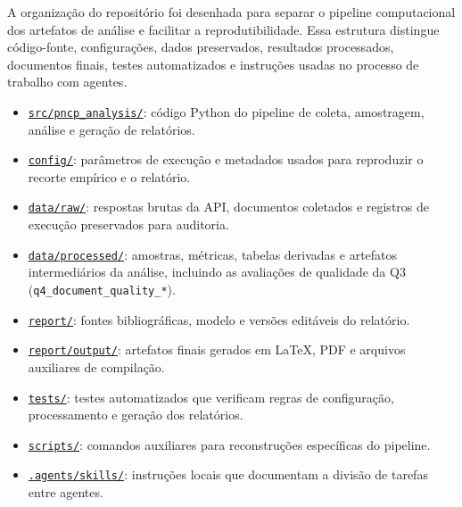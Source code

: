 \documentclass[12pt]{article}
\providecommand{\tightlist}{%
  \setlength{\itemsep}{0pt}\setlength{\parskip}{0pt}}
\begin{document}
A organização do repositório foi desenhada para separar o pipeline
computacional dos artefatos de análise e facilitar a reprodutibilidade.
Essa estrutura distingue código-fonte, configurações, dados preservados,
resultados processados, documentos finais, testes automatizados e
instruções usadas no processo de trabalho com agentes.

\begin{itemize}
\tightlist
\item
  \href{https://github.com/Amorim33/analise-pncp/tree/main/src/pncp_analysis}{\texttt{src/pncp\_analysis/}}:
  código Python do pipeline de coleta, amostragem, análise e geração de
  relatórios.
\item
  \href{https://github.com/Amorim33/analise-pncp/tree/main/config}{\texttt{config/}}:
  parâmetros de execução e metadados usados para reproduzir o recorte
  empírico e o relatório.
\item
  \href{https://github.com/Amorim33/analise-pncp/tree/main/data/raw}{\texttt{data/raw/}}:
  respostas brutas da API, documentos coletados e registros de execução
  preservados para auditoria.
\item
  \href{https://github.com/Amorim33/analise-pncp/tree/main/data/processed}{\texttt{data/processed/}}:
  amostras, métricas, tabelas derivadas e artefatos intermediários da
  análise, incluindo as avaliações de qualidade da Q3
  (\texttt{q4\_document\_quality\_*}).
\item
  \href{https://github.com/Amorim33/analise-pncp/tree/main/report}{\texttt{report/}}:
  fontes bibliográficas, modelo e versões editáveis do relatório.
\item
  \href{https://github.com/Amorim33/analise-pncp/tree/main/report/output}{\texttt{report/output/}}:
  artefatos finais gerados em LaTeX, PDF e arquivos auxiliares de
  compilação.
\item
  \href{https://github.com/Amorim33/analise-pncp/tree/main/tests}{\texttt{tests/}}:
  testes automatizados que verificam regras de configuração,
  processamento e geração dos relatórios.
\item
  \href{https://github.com/Amorim33/analise-pncp/tree/main/scripts}{\texttt{scripts/}}:
  comandos auxiliares para reconstruções específicas do pipeline.
\item
  \href{https://github.com/Amorim33/analise-pncp/tree/main/.agents/skills}{\texttt{.agents/skills/}}:
  instruções locais que documentam a divisão de tarefas entre agentes.
\end{itemize}
\end{document}
